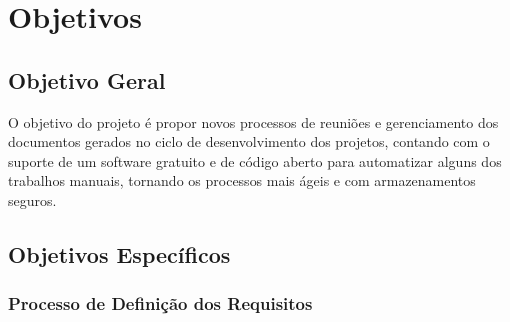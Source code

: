 \chapter[Objetivos]{Objetivos}

\section{Objetivo Geral}

O objetivo do projeto é propor novos processos de reuniões e gerenciamento dos documentos gerados no ciclo de desenvolvimento dos projetos, contando com o suporte de um software gratuito e de código aberto para automatizar alguns dos trabalhos manuais, tornando os processos mais ágeis e com armazenamentos seguros.

\section{Objetivos Específicos}

\subsection{Processo de Definição dos Requisitos}